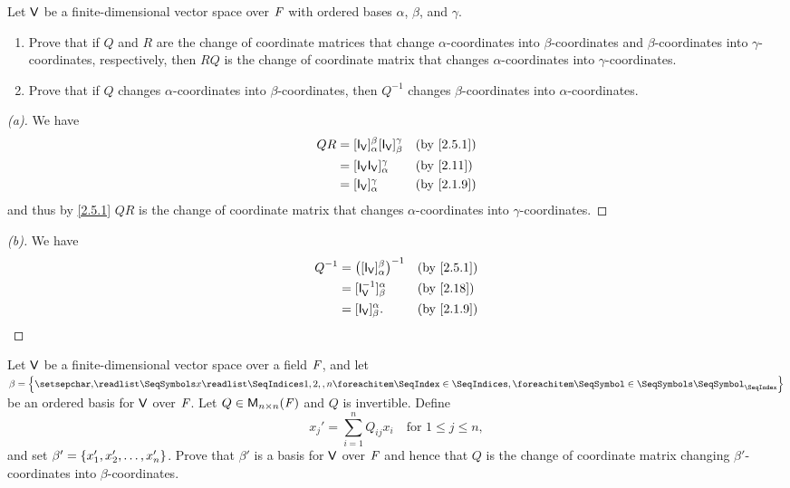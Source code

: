 \begin{ex}\label{ex:2.5.11}
	Let \(\mathsf{V}\) be a finite-dimensional vector space over \(\mathit{F}\) with ordered bases \(\alpha\), \(\beta\), and \(\gamma\).
	\begin{enumerate}
		\item Prove that if \(Q\) and \(R\) are the change of coordinate matrices that change \(\alpha\)-coordinates into \(\beta\)-coordinates and \(\beta\)-coordinates into \(\gamma\)-coordinates, respectively, then \(RQ\) is the change of coordinate matrix that changes \(\alpha\)-coordinates into \(\gamma\)-coordinates.
		\item Prove that if \(Q\) changes \(\alpha\)-coordinates into \(\beta\)-coordinates, then \(Q^{-1}\) changes \(\beta\)-coordinates into \(\alpha\)-coordinates.
	\end{enumerate}
\end{ex}

\begin{proof}[(a)]
	We have
	\begin{align*}
		QR & = [\IT[\V]]_{\alpha}^{\beta} [\IT[\V]]_{\beta}^{\gamma} &  & \by{2.5.1} \\
		   & = [\IT[\V] \IT[\V]]_{\alpha}^{\gamma}                   &  & \by{2.11}  \\
		   & = [\IT[\V]]_{\alpha}^{\gamma}                           &  & \by{2.1.9}
	\end{align*}
	and thus by \cref{2.5.1} \(QR\) is the change of coordinate matrix that changes \(\alpha\)-coordinates into \(\gamma\)-coordinates.
\end{proof}

\begin{proof}[(b)]
	We have
	\begin{align*}
		Q^{-1} & = \pa{[\IT[\V]]_{\alpha}^{\beta}}^{-1} &  & \by{2.5.1} \\
		       & = [\IT[\V]^{-1}]_{\beta}^{\alpha}      &  & \by{2.18}  \\
		       & = [\IT[\V]]_{\beta}^{\alpha}.          &  & \by{2.1.9}
	\end{align*}
\end{proof}

\setcounter{ex}{12}
\begin{ex}\label{ex:2.5.13}
	Let \(\mathsf{V}\) be a finite-dimensional vector space over a field \(\mathit{F}\), and let \(\beta = \set{\seq{x}{1,2,,n}}\) be an ordered basis for \(\mathsf{V}\) over \(\mathit{F}\).
	Let \(Q \in \mathsf{M}_{{n} \times n}({\mathit{F}})\) and \(Q\) is invertible.
	Define
	\[
		x_j' = \sum_{i = 1}^n Q_{i j} x_i \quad \text{for } 1 \leq j \leq n,
	\]
	and set \(\beta' = \left\lbrace x_1', x_2', \dots, x_n'\right\rbrace\).
	Prove that \(\beta'\) is a basis for \(\mathsf{V}\) over \(\mathit{F}\) and hence that \(Q\) is the change of coordinate matrix changing \(\beta'\)-coordinates into \(\beta\)-coordinates.
\end{ex}


